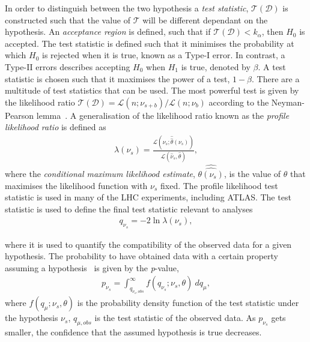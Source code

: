 In order to distinguish between the two hypothesis a \emph{test statistic}, $\mathcal{T}(\mathcal{D})$ is constructed such that the value of $\mathcal{T}$ will be different dependant on the hypothesis. An \emph{acceptance region} is defined, such that if $\mathcal{T}(\mathcal{D}) < k_\alpha$, then $H_0$ is accepted. The test statistic is defined such that it minimises the probability at which $H_0$ is rejected when it is true, known as a Type-I error. In contrast, a Type-II errors describes accepting $H_0$ when $H_1$ is true, denoted by $\beta$. A test statistic is chosen such that it maximises the power of a test, $1-\beta$. There are a multitude of test statistics that can be used. The most powerful test is given by the likelihood ratio $\mathcal{T}(\mathcal{D}) = \mathcal{L}(n;\nu_{s+b})/\mathcal{L}(n;\nu_{b})$ according to the Neyman-Pearson lemma~\cite{Cowan1998}. A generalisation of the likelihood ratio known as the \emph{profile likelihood ratio} is defined as
\begin{equation}
    \label{eq:profLL}
    \begin{aligned}
        \lambda(\nu_s) = \frac{\mathcal{L}(\nu_s;\hat{\hat{\theta}}(\nu_s))}{\mathcal{L}(\hat{\nu}_s,\hat{\theta})},
    \end{aligned}
\end{equation}
where the \emph{conditional maximum likelihood estimate}, $\hat{\hat{\theta(\nu_s)}}$,  is the value of $\theta$ that maximises the likelihood function with $\nu_s$ fixed. The profile likelihood test statistic is used in many of the LHC experiments, including ATLAS. The test statistic is used to define the final test statistic relevant to analyses
\begin{equation}
    \label{eq:teststat}
    \begin{aligned}
        q_{\nu_s} = -2\ln\lambda(\nu_s),
    \end{aligned}
\end{equation}

where it is used to quantify the compatibility of the observed data for a given hypothesis. The probability to have obtained data with a certain property assuming a hypothesis~\cite{Cranmer:2015nia} is given by the \emph{p}-value, 
\begin{equation}
    \label{eq:pvalue}
    \begin{aligned}
        p_{\nu_s} = \int_{q_{\nu_{s},obs}}^\infty f(q_{\nu_s};\nu_s,\theta)~dq_\mu,
    \end{aligned}
\end{equation}
where $f(q_\mu;\nu_s,\theta)$ is the probability density function of the test statistic under the hypothesis $\nu_s$, $q_{\mu,obs}$ is the test statistic of the observed data. As $p_{\nu_s}$ gets smaller, the confidence that the assumed hypothesis is true decreases. 

